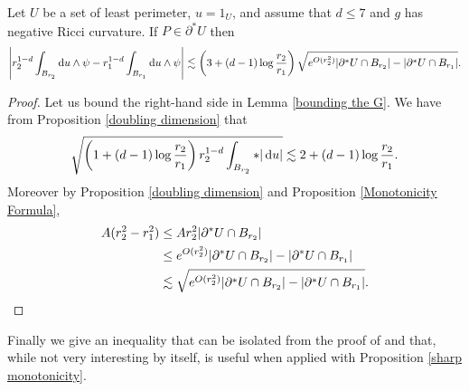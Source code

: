 \begin{proposition}\label{sharp monotonicity}
Let $U$ be a set of least perimeter, $u = 1_U$, and assume that $d \leq 7$ and $g$ has negative Ricci curvature.
If $P \in \partial^* U$ then 
\begin{align*}
\left|r_2^{1 - d} \int_{B_{r_2}} \mathop{}\!\mathrm{d} u \wedge \psi - r_1^{1 - d} \int_{B_{r_1}} \mathop{}\!\mathrm{d} u \wedge \psi \right| \lesssim \left(3 + (d - 1) \log \frac{r_2}{r_1}\right) \sqrt{e^{O(r_2^2)}|\partial^* U \cap B_{r_2}| - |\partial^* U \cap B_{r_1}|}.
\end{align*}
\end{proposition}
\begin{proof}
Let us bound the right-hand side in Lemma \ref{bounding the G}.
We have from Proposition \ref{doubling dimension} that 
$$\sqrt{\left(1 + (d - 1) \log \frac{r_2}{r_1}\right) r_2^{1 - d} \int_{B_{r_2}} *|\mathop{}\!\mathrm{d} u|} \lesssim 2 + (d - 1) \log \frac{r_2}{r_1}.$$
Moreover by Proposition \ref{doubling dimension} and Proposition \ref{Monotonicity Formula},
\begin{align*}
A(r_2^2 - r_1^2) &\leq Ar_2^2 |\partial^* U \cap B_{r_2}| \\
&\leq e^{O(r_2^2)}|\partial^* U \cap B_{r_2}| - |\partial^* U \cap B_{r_1}| \\
&\lesssim \sqrt{e^{O(r_2^2)}|\partial^* U \cap B_{r_2}| - |\partial^* U \cap B_{r_1}|}. \qedhere
\end{align*}
\end{proof}

Finally we give an inequality that can be isolated from the proof of \cite[Theorem 7.3]{Giusti77} and that, while not very interesting by itself, is useful when applied with Proposition \ref{sharp monotonicity}.

